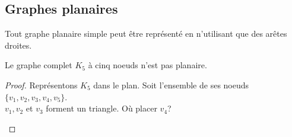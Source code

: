\subsection{Graphes planaires}
\begin{mytheo} [Fáry]
  Tout graphe planaire simple peut être représenté en n'utilisant que des arêtes droites.
\end{mytheo}



\begin{mytheo}
Le graphe complet $K_5$ à cinq noeuds n'est pas planaire.

  \begin{proof}

  Représentons $K_5$ dans le plan. Soit l'ensemble de ses noeuds $\{v_1, v_2, v_3, v_4, v_5\}$.\\
  $v_1, v_2$ et $v_3$ forment un triangle. Où placer $v_4$?

    \begin{center}
    \end{center}



\end{proof}
\end{mytheo}
